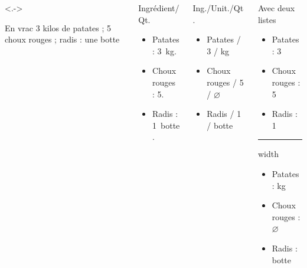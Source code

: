 \begin{slide}

\begin{columns}[T]
	\begin{column}{0.25\textwidth}<.->
		\beamerdefaultoverlayspecification{}
		\begin{exampleblock}{En vrac}
		3 kilos de patates ; 5 choux rouges ; radis : une botte
		\end{exampleblock}	
	\end{column}
	
	\begin{column}{0.25\textwidth}
		\beamerdefaultoverlayspecification{}
		\begin{exampleblock}{Ingrédient/Qt.}
			\begin{itemize}
				\item Patates : 3~kg.
				\item Choux rouges : 5.
				\item Radis : 1~botte.
			\end{itemize}
		\end{exampleblock}
	\end{column}
	
	\begin{column}{0.25\textwidth}
		\beamerdefaultoverlayspecification{}
		\begin{exampleblock}{Ing./Unit./Qt.}
			\begin{itemize}
				\item Patates / 3 / kg
				\item Choux rouges / 5 / $\varnothing$\
				\item Radis / 1 / botte
			\end{itemize}
		\end{exampleblock}
	\end{column}
	\begin{column}{0.25\textwidth}
		\beamerdefaultoverlayspecification{}
		\begin{exampleblock}{Avec deux listes}
			\begin{itemize}
				\item Patates : 3
				\item Choux rouges : 5
				\item Radis : 1
			\end{itemize}
			\hrule width \textwidth
			\begin{itemize}
				\item Patates : kg
				\item Choux rouges : $\varnothing$\
				\item Radis : botte
			\end{itemize}
		\end{exampleblock}
	\end{column}
\end{columns}
\end{slide}

